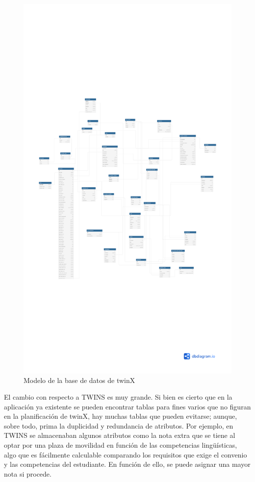 \begin{figure}[H]
	\centering
	\includegraphics[page=2,width=\textwidth,height=\textheight,trim=0 0 0 10cm, clip=true]{pdf/modelo_bd}
	\caption{Modelo de la base de datos de twinX}
	\label{fig:modeloBD}
\end{figure}

El cambio con respecto a TWINS es muy grande. Si bien es cierto que en la aplicación ya existente se pueden encontrar tablas para fines varios que no figuran en la planificación de twinX, hay muchas tablas que pueden evitarse; aunque, sobre todo, prima la duplicidad y redundancia de atributos. Por ejemplo, en TWINS se almacenaban algunos atributos como la nota extra que se tiene al optar por una plaza de movilidad en función de las competencias lingüísticas, algo que es fácilmente calculable comparando los requisitos que exige el convenio y las competencias del estudiante. En función de ello, se puede asignar una mayor nota si procede.


